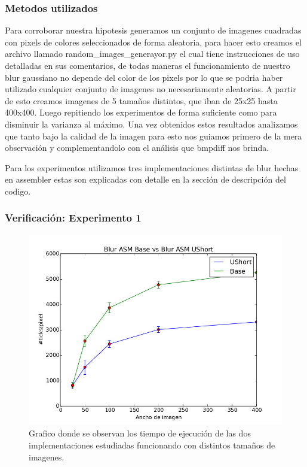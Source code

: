 \subsubsection{Metodos utilizados}

Para corroborar nuestra hipotesis generamos un conjunto de imagenes cuadradas con pixels de colores seleccionados de forma aleatoria, para hacer esto creamos el archivo llamado random\_images\_generayor.py el cual tiene instrucciones de uso detalladas en sus comentarios, de todas maneras el funcionamiento de nuestro blur gaussiano no depende del color de los pixels por lo que se podria haber utilizado cualquier conjunto de imagenes no necesariamente aleatorias. A partir de esto creamos imagenes de 5 tamaños distintos, que iban de 25x25 hasta 400x400. Luego repitiendo los experimentos de forma suficiente como para disminuir la varianza al máximo. Una vez obtenidos estos resultados analizamos que tanto bajo la calidad de la imagen para esto nos guiamos primero de la mera observación y complementandolo con el análisis que bmpdiff nos brinda.

Para los experimentos utilizamos tres implementaciones distintas de blur hechas en assembler estas son explicadas con detalle en la sección de descripción del codigo.

\subsubsection{Verificación: Experimento 1}


\begin{figure}[H]
\centering
    \includegraphics[scale=0.5]{imgs/blur_ushort.jpg} 
  \caption{\footnotesize{Grafico donde se observan los tiempo de ejecución de las dos implementaciones estudiadas funcionando con distintos tamaños de imagenes.}}
  \label{fig:tiempo2}
\end{figure}

